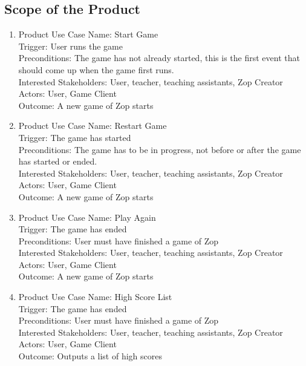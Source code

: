 \documentclass[12pt]{article}
\begin{document}
\subsection{Scope of the Product}
\begin{enumerate}
 \item Product Use Case Name: Start Game\\
 Trigger: User runs the game\\
 Preconditions: The game has not already started, this is the first event that should come up when the game first runs. \\
 Interested Stakeholders: User, teacher, teaching assistants, Zop Creator\\
 Actors: User, Game Client\\
 Outcome: A new game of Zop starts\\
 
 \item Product Use Case Name: Restart Game\\
 Trigger: The game has started\\
 Preconditions: The game has to be in progress, not before or after the game has started or ended. \\
 Interested Stakeholders: User, teacher, teaching assistants, Zop Creator\\
 Actors: User, Game Client\\
 Outcome: A new game of Zop starts\\
 
 \item Product Use Case Name: Play Again\\
 Trigger: The game has ended\\
 Preconditions: User must have finished a game of Zop\\
 Interested Stakeholders: User, teacher, teaching assistants, Zop Creator\\
 Actors: User, Game Client\\
 Outcome: A new game of Zop starts\\
 
 \item Product Use Case Name: High Score List\\
 Trigger: The game has ended\\
 Preconditions: User must have finished a game of Zop\\
 Interested Stakeholders: User, teacher, teaching assistants, Zop Creator\\
 Actors: User, Game Client\\
 Outcome: Outputs a list of high scores\\
 

\end{enumerate}
\end{document}
